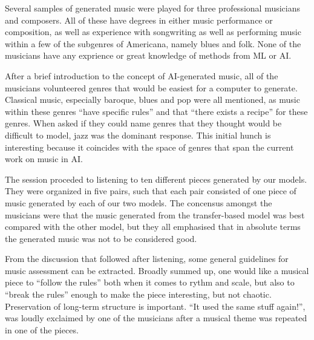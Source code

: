 \documentclass{IEEEtran}
\begin{document}
Several samples of generated music were played for three
professional musicians and composers. All of these have degrees in
either music performance or composition, as well as experience with 
songwriting as well as performing music within a few of the subgenres of 
Americana, namely blues and folk. None of the musicians have any 
exprience or great knowledge of methods from ML or AI.

After a brief introduction to the concept of AI-generated music,
all of the musicians 
volunteered genres that would be easiest for a computer to generate. 
Classical music, especially baroque, blues and pop were all mentioned, 
as music within these genres ``have specific rules'' and that 
``there exists a recipe'' for these genres.
When asked if they could name genres that 
they thought would be difficult to model, jazz was the dominant response.
This initial hunch is interesting because 
it coincides with the space of genres that span the current work on music 
in AI.

The session proceded to listening to ten different pieces generated by our models.
They were organized in five pairs, such that each pair consisted of one 
piece of music generated by each of our two models.
The concensus amongst the musicians were that the music generated from 
the transfer-based model was best compared with the other model, but they
all emphasised that in absolute terms the generated music was not to be 
considered good.

From the discussion that followed after listening,
some general guidelines for music assessment can be 
extracted. Broadly summed up, one would like a musical piece to
``follow the rules'' both when it comes to rythm and scale, but also to 
``break the rules'' enough to make the piece interesting, but not 
chaotic. Preservation of long-term structure is important.
``It used the same stuff again!'', was loudly exclaimed 
by one of the musicians after a musical theme was repeated in one of the 
pieces.
\end{document}
